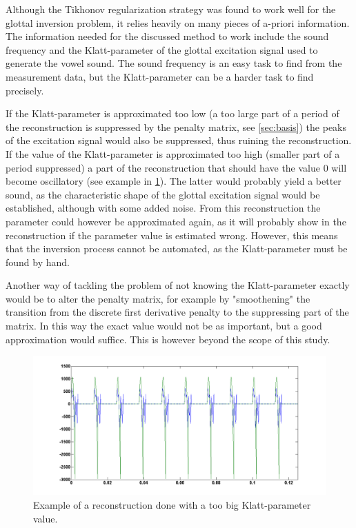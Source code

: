\documentclass[12pt,a4]{article}
\begin{document}
Although the Tikhonov regularization strategy was found to work well for the glottal inversion problem, it relies heavily on many pieces of a-priori information. The information needed for the discussed method to work include the sound frequency and the Klatt-parameter of the glottal excitation signal used to generate the vowel sound. The sound frequency is an easy task to find from the measurement data, but the Klatt-parameter can be a harder task to find precisely.

If the Klatt-parameter is approximated too low (a too large part of a period of the reconstruction is suppressed by the penalty matrix, see \cref{sec:basis}) the peaks of the excitation signal would also be suppressed, thus ruining the reconstruction. If the value of the Klatt-parameter is approximated too high (smaller part of a period suppressed) a part of the reconstruction that should have the value 0 will become oscillatory (see example in \cref{fig:tooBigQ}). The latter would probably yield a better sound, as the characteristic shape of the glottal excitation signal would be established, although with some added noise. From this reconstruction the parameter could however be approximated again, as it will probably show in the reconstruction if the parameter value is estimated wrong. However, this means that the inversion process cannot be automated, as the Klatt-parameter must be found by hand.

Another way of tackling the problem of not knowing the Klatt-parameter exactly would be to alter the penalty matrix, for example by "smoothening" the transition from the discrete first derivative penalty to the suppressing part of the matrix. In this way the exact value would not be as important, but a good approximation would suffice. This is however beyond the scope of this study.

\begin{figure}[H]
\begin{center}
\includegraphics[scale=.3]{img/tooBigQ.png}
\end{center}
\caption{Example of a reconstruction done with a too big Klatt-parameter value.}
\label{fig:tooBigQ}
\end{figure}
\end{document}
